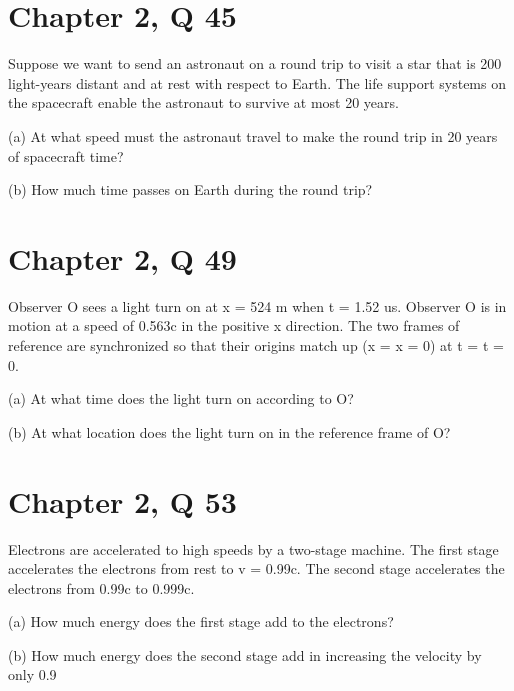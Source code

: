 \documentclass{article}
\begin{document}
\section*{Chapter 2, Q 45}
Suppose we want to send an astronaut on a round trip to
visit a star that is 200 light-years distant and at rest with
respect to Earth. The life support systems on the spacecraft
enable the astronaut to survive at most 20 years.

(a) At what speed must the astronaut travel to make the round trip in
20 years of spacecraft time?




(b) How much time passes on Earth during the round trip?


\section*{Chapter 2, Q 49}
Observer O sees a light turn on at x = 524 m when
t = 1.52 us. Observer O is in motion at a speed of 0.563c
in the positive x direction. The two frames of reference are
synchronized so that their origins match up (x = x = 0) at
t = t = 0.

(a) At what time does the light turn on according to O?

(b) At what location does the light turn on in the reference frame of O?


\section*{Chapter 2, Q 53}

Electrons are accelerated to high speeds by a two-stage
machine. The first stage accelerates the electrons from rest
to v = 0.99c. The second stage accelerates the electrons
from 0.99c to 0.999c.

(a) How much energy does the first stage add to the electrons?

(b) How much energy does the second stage add in increasing the velocity by only 0.9
\end{document}
